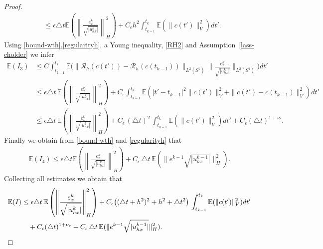 \documentclass[a4paper,10pt]{article}
\numberwithin{equation}{section}
\begin{document}
\begin{proof}
\begin{align*}
& \leq \epsilon \triangle t \mathbb{E} \left (\left \| \frac{e_{x}^{k}}{\sqrt{|u^{k}_{hx}| } } \right \| ^{2}_{H} \right) + C_{\epsilon} h^{2} \int_{t_{k-1}}^{t_{k}}\mathbb{E} (\| c(t')\|^{2}_{V} )dt'.
\end{align*}
Using \eqref{bound-wth},\eqref{regularityh}, a Young inequality, \eqref{RH2} and Assumption~\ref{lass-cholder}
 we infer
\begin{align*}
\mathbb{E}(I_{3}) &\leq C \int_{t_{k-1}}^{t_{k}} \mathbb{E} \Big( \| \mathcal{R}_{h} (c(t'))- \mathcal{R}_{h}( c(t_{k-1}))\|_{L^{2}(S^{1})} \| \frac{e^{k}_{x}}{\sqrt{|u^{k}_{hx}|}}\|_{L^{2}(S^{1})} \Big) dt'\\
& \leq \epsilon \triangle t \, \mathbb{E} \left (\left \| \frac{e_{x}^{k}}{\sqrt{|u^{k}_{hx}| } } \right \| ^{2}_{H} \right) + C_{\epsilon} \int_{t_{k-1}}^{t_{k}} \mathbb{E} (|t' -t_{k-1}|^2 \|c(t')\|^{2}_{V} + \| c(t')-c(t_{k-1})\|^{2}_{V} ) dt'\\
& \leq \epsilon \triangle t \, \mathbb{E} \left (\left \| \frac{e_{x}^{k}}{\sqrt{|u^{k}_{hx}| } } \right \| ^{2}_{H} \right) + C_{\epsilon} \, (\triangle t)^2 \,\int_{t_{k-1}}^{t_{k}} \mathbb{E} ( \|c(t')\|^{2}_{V} ) dt' + C_{\epsilon} (\triangle t)^{1+\nu_{r}}.
\end{align*}
Finally we obtain from \eqref{bound-wth} and \eqref{regularityh} that
\begin{align*}
\mathbb{E}(I_{4}) \leq \epsilon \triangle t \mathbb{E} \left (\left \| \frac{e_{x}^{k}}{\sqrt{|u^{k}_{hx}| } } \right \| ^{2}_{H} \right) + C_{\epsilon} \, \triangle t \, \mathbb{E} (\| e^{k-1}\sqrt{|u^{k-1}_{hx}|}\|_{H}^{2}).
\end{align*}
Collecting all estimates we obtain that
\begin{align}\label{term1}
\mathbb{E}(I) &\leq \epsilon \triangle t \, \mathbb{E} \left (\left \| \frac{e_{x}^{k}}{\sqrt{|u^{k}_{hx}| } } \right \| ^{2}_{H} \right) + C_{\epsilon} \big{(} (\triangle t + h^{2})^2 + h^2 + \triangle t^2 \big{)} \,\int_{t_{k-1}}^{t_{k}} \mathbb{E} ( \|c(t')\|^{2}_{V} ) dt' \\
& \quad + C_{\epsilon} (\triangle t)^{1+\nu_{r}} + C_{\epsilon} \, \triangle t \, \mathbb{E} (\| e^{k-1}\sqrt{|u^{k-1}_{hx}|}\|_{H}^{2}).
\notag
\end{align}


\end{proof}
\end{document}
